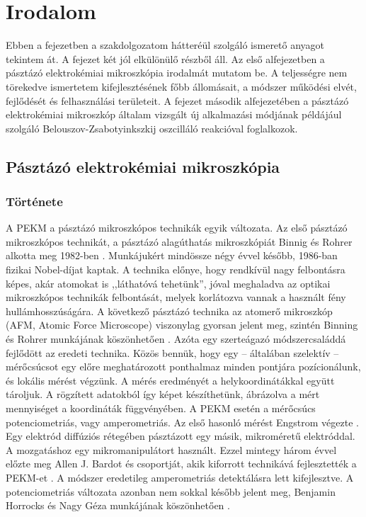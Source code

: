 \chapter{Irodalom}
\pagestyle{headings}

Ebben a fejezetben a szakdolgozatom hátteréül szolgáló ismerető anyagot tekintem át. A fejezet két jól elkülönülő részből áll. Az első alfejezetben a pásztázó elektrokémiai mikroszkópia irodalmát mutatom be. A teljességre nem törekedve ismertetem kifejlesztésének főbb állomásait, a módszer működési elvét, fejlődését és felhasználási területeit. A fejezet második alfejezetében a pásztázó elektrokémiai mikroszkóp általam vizsgált új alkalmazási módjának példájául szolgáló Belouszov-Zsabotyinkszkij oszcilláló reakcióval foglalkozok. 

\section{Pásztázó elektrokémiai mikroszkópia}

\subsection{Története}

A PEKM a pásztázó mikroszkópos technikák egyik változata. Az első pásztázó mikroszkópos technikát, a pásztázó alagúthatás mikroszkópiát Binnig és Rohrer alkotta meg 1982-ben \cite{binnig1982surface}. Munkájukért mindössze négy évvel később, 1986-ban fizikai Nobel-díjat kaptak. A technika előnye, hogy rendkívül nagy felbontásra képes, akár atomokat is ,,láthatóvá tehetünk'', jóval meghaladva az optikai mikroszkópos technikák felbontását, melyek korlátozva vannak a használt fény hullámhosszúságára. A következő pásztázó technika az atomerő mikroszkóp (AFM, Atomic Force Microscope) viszonylag gyorsan jelent meg, szintén Binning és Rohrer munkájának köszönhetően \cite{binnig1986atomic, bennig1988atomic}. Azóta egy szerteágazó módszercsaláddá fejlődött az eredeti technika. Közös bennük, hogy egy -- általában szelektív -- mérőcsúcsot egy előre meghatározott ponthalmaz minden pontjára pozícionálunk, és lokális mérést végzünk. A mérés eredményét a helykoordinátákkal együtt tároljuk. A rögzített adatokból így képet készíthetünk, ábrázolva a mért mennyiséget a koordináták függvényében. A PEKM esetén a mérőcsúcs potenciometriás, vagy amperometriás. Az első hasonló mérést Engstrom végezte \cite{engstrom1986measurements}. Egy elektród diffúziós rétegében pásztázott egy másik, mikroméretű elektróddal. A mozgatáshoz egy mikromanipulátort használt. Ezzel mintegy három évvel előzte meg Allen J. Bardot és csoportját, akik kiforrott technikává fejlesztették a PEKM-et \cite{bard1989scanning}. A módszer eredetileg amperometriás detektálásra lett kifejlesztve. A potenciometriás változata azonban nem sokkal később jelent meg, Benjamin Horrocks és Nagy Géza munkájának köszönhetően \cite{horrocks1993scanning}.

